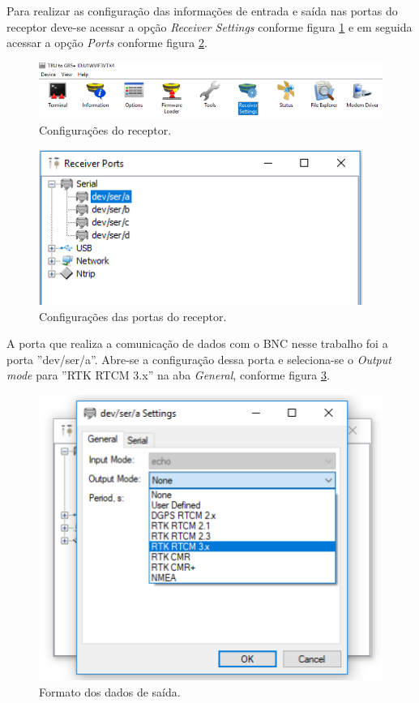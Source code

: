 Para realizar as configuração das informações de entrada e saída nas portas do receptor deve-se acessar a opção \textit{Receiver Settings} conforme figura \ref{TRU_rec_settings} e em seguida acessar a opção \textit{Ports} conforme figura \ref{TRU_rec_ports}.

\begin{figure}[H]
\centering
\includegraphics[scale=0.5]{pfc_pdf_files/img/TRU_6_rec_set.png}
\caption{Configurações do receptor.}
\label{TRU_rec_settings}
\end{figure}

\begin{figure}[H]
\centering
\includegraphics[scale=0.6]{pfc_pdf_files/img/TRU_7_rec_ports.png}
\caption{Configurações das portas do receptor.}
\label{TRU_rec_ports}
\end{figure}

A porta que realiza a comunicação de dados com o BNC nesse trabalho foi a porta ''dev/ser/a''. Abre-se a configuração dessa porta e seleciona-se o \textit{Output mode} para ''RTK RTCM 3.x'' na aba \textit{General}, conforme figura \ref{porta_a}.

\begin{figure}[H]
\centering
\includegraphics[scale=0.6]{pfc_pdf_files/img/TRU_9_porta_a.png} %
\caption{Formato dos dados de saída.}
\label{porta_a}
\end{figure}

